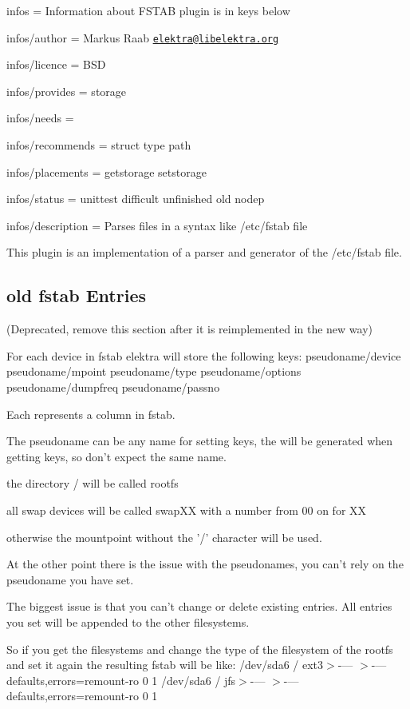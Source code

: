 
\begin{DoxyItemize}
\item infos = Information about F\+S\+T\+A\+B plugin is in keys below
\item infos/author = Markus Raab \href{mailto:elektra@libelektra.org}{\tt elektra@libelektra.\+org}
\item infos/licence = B\+S\+D
\item infos/provides = storage
\item infos/needs =
\item infos/recommends = struct type path
\item infos/placements = getstorage setstorage
\item infos/status = unittest difficult unfinished old nodep
\item infos/description = Parses files in a syntax like /etc/fstab file
\end{DoxyItemize}

This plugin is an implementation of a parser and generator of the /etc/fstab file.

\subsection*{old fstab Entries}

(Deprecated, remove this section after it is reimplemented in the new way)

For each device in fstab elektra will store the following keys\+: pseudoname/device pseudoname/mpoint pseudoname/type pseudoname/options pseudoname/dumpfreq pseudoname/passno

Each represents a column in fstab.

The pseudoname can be any name for setting keys, the will be generated when getting keys, so don't expect the same name.

the directory / will be called rootfs

all swap devices will be called swap\+X\+X with a number from 00 on for X\+X

otherwise the mountpoint without the '/' character will be used.

At the other point there is the issue with the pseudonames, you can't rely on the pseudoname you have set.

The biggest issue is that you can't change or delete existing entries. All entries you set will be appended to the other filesystems.

So if you get the filesystems and change the type of the filesystem of the rootfs and set it again the resulting fstab will be like\+: /dev/sda6 / ext3$>$-\/--- $>$-\/---defaults,errors=remount-\/ro 0 1 /dev/sda6 / jfs$>$-\/--- $>$-\/---defaults,errors=remount-\/ro 0 1

